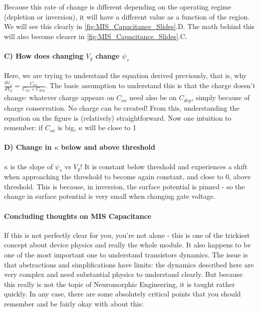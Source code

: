 Because this rate of change is different depending on the operating regime (depletion or inversion), it will have a different value as a function of the region. We will see this clearly in \ref{fig:MIS_Capacitance_Slides}.D. The math behind this will also become clearer in \ref{fig:MIS_Capacitance_Slides}.C.

\paragraph{C) How does changing $V_g$ change $\psi_s$} Here, we are trying to understand the equation derived previously, that is, why $\frac{d\psi_s}{dV_g} = \frac{C_{ox}}{C_{ox} + C_{dep}}$. The basic assumption to understand this is that the charge doesn't change: whatever charge appears on $C_{ox}$ need also be on $C_{dep}$, simply because of charge conservation. No charge can be created! From this, understanding the equation on the figure is (relatively) straightforward. 
Now one intuition to remember: if $C_{ox}$ is big, $\kappa$ will be close to 1

\paragraph{D) Change in $\kappa$ below and above threshold} $\kappa$ is the slope of $\psi_s$ vs $V_g$! It is constant below threshold and experiences a shift when approaching the threshold to become again constant, and close to 0, above threshold. This is because, in inversion, the surface potential is pinned - so the change in surface potential is very small when changing gate voltage. 

\paragraph{Concluding thoughts on MIS Capacitance}

If this is not perfectly clear for you, you're not alone - this is one of the trickiest concept about device physics and really the whole module. It also happens to be one of the most important one to understand transistors dynamics. The issue is that abstractions and simplifications have limits: the dynamics described here are very complex and need substantial physics to understand clearly. But because this really is not the topic of Neuromorphic Engineering, it is taught rather quickly. In any case, there are some absolutely critical points that you should remember and be fairly okay with about this: 

